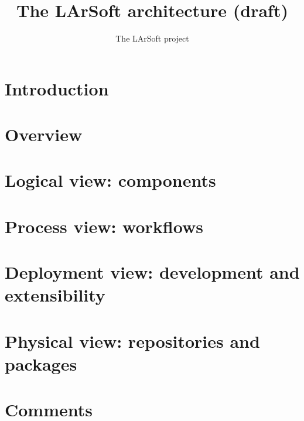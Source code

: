 \documentclass{article}
\begin{document}
\title{The LArSoft architecture (draft)}
\author{The LArSoft project}
\maketitle

\linenumbers

\tableofcontents

\section{Introduction}
\label{sec:introduction}




\section{Overview}
\label{sec:Overview}




\section{Logical view: components}
\label{sec:Components}




\section{Process view: workflows}
\label{sec:Workflows}




\section{Deployment view: development and extensibility}
\label{sec:Development}




\section{Physical view: repositories and packages}
\label{sec:Packages}








\clearpage
\appendix


\section*{Comments}
\label{sec:comments}


\end{document}
